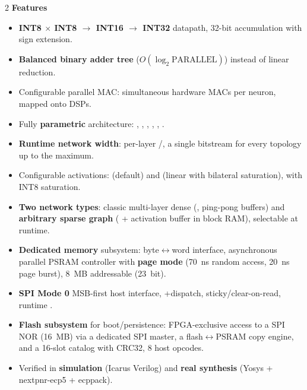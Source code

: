 \vspace{8pt}
\begin{multicols}{2}
{\color{fnDark}\large\bfseries Features}\\[2pt]
{\footnotesize
\begin{itemize}[leftmargin=1.1em]
\item \textbf{INT8 $\times$ INT8 $\to$ INT16 $\to$ INT32} datapath, 32-bit accumulation
      with sign extension.
\item \textbf{Balanced binary adder tree} ($O(\log_2 \text{PARALLEL})$) instead of
      linear reduction.
\item Configurable parallel MAC:  simultaneous hardware MACs per neuron,
      mapped onto  DSPs.
\item Fully \textbf{parametric} architecture: , ,
      , , , .
\item \textbf{Runtime network width}: per-layer /,
      a single bitstream for every topology up to the maximum.
\item Configurable activations:  (default) and  (linear
      with bilateral saturation), with INT8 saturation.
\item \textbf{Two network types}: classic multi-layer dense (,
      ping-pong buffers) and \textbf{arbitrary sparse graph} ( +
      activation buffer in  block RAM), selectable at runtime.
\item \textbf{Dedicated memory} subsystem: byte$\leftrightarrow$word interface,
      asynchronous parallel PSRAM controller with \textbf{page mode} (70~ns random
      access, 20~ns page burst), 8~MB addressable (23~bit).
\item \textbf{SPI Mode 0} MSB-first host interface, +dispatch, 
      sticky/clear-on-read, runtime .
\item \textbf{Flash subsystem} for boot/persistence: FPGA-exclusive access to a
       SPI NOR (16~MB) via a dedicated SPI master, a
      flash$\leftrightarrow$PSRAM copy engine, and a 16-slot catalog with CRC32,
      8 host opcodes.
\item Verified in \textbf{simulation} (Icarus Verilog) and \textbf{real synthesis}
      (Yosys + nextpnr-ecp5 + ecppack).
\end{itemize}}


\end{multicols}
